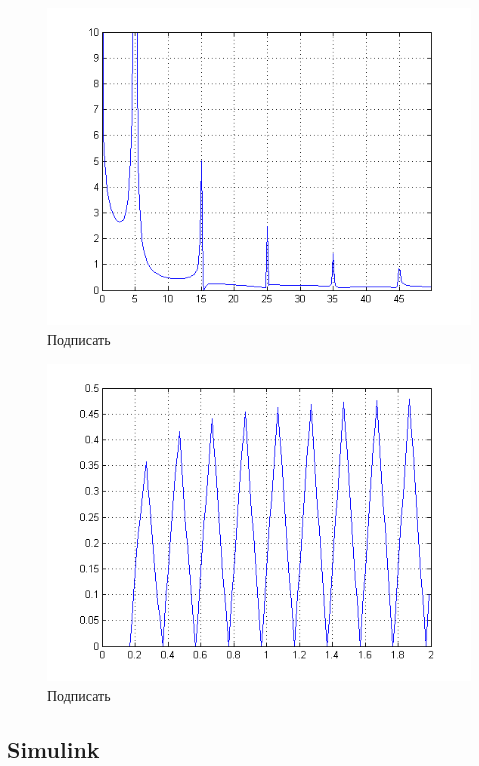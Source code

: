 \documentclass[a4paper, 12pt]{article}
\begin{document}
\begin{figure}[H]
   \includegraphics[scale=0.7]{lab5/1.png}
   \caption{Подписать}
\end{figure}

\begin{figure}[H]
   \includegraphics[scale=0.7]{lab5/2.png}
   \caption{Подписать}
\end{figure}

\subsection{Simulink}
\end{document}
